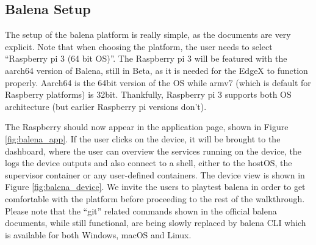 \subsection{Balena Setup}

The setup of the balena platform is really simple, as the documents are very explicit\cite{balenaintro}.  Note that when choosing the platform, the user needs to select “Raspberry pi 3 (64 bit OS)”. The Raspberry pi 3 will be featured with the aarch64 version of Balena, still in Beta, as it is needed for the EdgeX to function properly. Aarch64 is the 64bit version of the OS while armv7 (which is default for Raspberry platforms) is 32bit. Thankfully, Raspberry pi 3 supports both OS architecture (but earlier Raspberry pi versions don’t).

The Raspberry should now appear in the application page, shown in Figure \ref{fig:balena_app}. If the user clicks on the device, it will be brought to the dashboard, where the user can overview the services running on the device, the logs the device outputs and also connect to a shell, either to the hostOS, the supervisor container or any user-defined containers. The device view is shown in Figure \ref{fig:balena_device}. We invite the users to playtest balena in order to get comfortable with the platform before proceeding to the rest of the walkthrough. Please note that the “git” related commands shown in the official balena documents, while still functional, are being slowly replaced by balena CLI\cite{balenacli} which is available for both Windows, macOS and Linux.
\newpage
